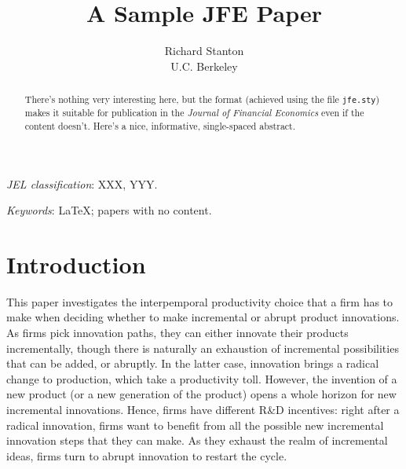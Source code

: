 \documentclass[letterpaper,12pt]{article}
\theoremstyle{definition}
\begin{document}
\title{A Sample JFE Paper}

\author{Richard Stanton\\
  U.C. Berkeley}

\date{}              %


\renewcommand{\thefootnote}{\fnsymbol{footnote}}

\singlespacing

\maketitle

\vspace{-.2in}
\begin{abstract}
\noindent There's nothing very interesting here, but the format (achieved using the file \texttt{jfe.sty}) makes it suitable for publication in the \emph{Journal of Financial Economics} even if the content doesn't. Here's a nice, informative, single-spaced abstract.
\end{abstract}

\medskip

\noindent \textit{JEL classification}: XXX, YYY.

\medskip
\noindent \textit{Keywords}: \LaTeX; papers with no content.

\thispagestyle{empty}

\onehalfspacing
\setcounter{footnote}{0}
\renewcommand{\thefootnote}{\arabic{footnote}}
\setcounter{page}{1}

\section{Introduction}

This paper investigates the interpemporal productivity choice that a firm has to make when deciding whether to make incremental or abrupt product innovations. As firms pick innovation paths, they can either innovate their products incrementally, though there is naturally an exhaustion of incremental possibilities that can be added, or abruptly. In the latter case, innovation brings a radical change to production, which take a productivity toll. However, the invention of a new product (or a new generation of the product) opens a whole horizon for new incremental innovations. Hence, firms have different R\&D incentives: right after a radical innovation, firms want to benefit from all the possible new incremental innovation steps that they can make. As they exhaust the realm of incremental ideas, firms turn to abrupt innovation to restart the cycle.
\end{document}
